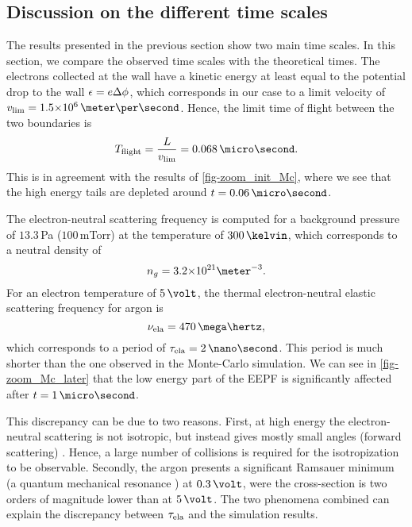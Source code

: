   \subsection{Discussion on the different time scales}
    The results presented in the previous section show two main time scales.
    In this section, we compare the observed time scales with the theoretical times.
    The electrons collected at the wall have a kinetic energy at least equal to the potential drop to the wall $\epsilon = e \Delta \phi$, which corresponds in our case to a limit velocity of $v_{\rm lim} = \sn{1.5}{6} \,\meter\per\second$.
    Hence, the limit time of flight between the two boundaries is
    \[ T_{\rm flight} = \frac{L}{v_{\rm lim}} = 0.068 \,\micro\second.  \]
    This is in agreement with the results of \cref{fig-zoom_init_Mc}, where we see that the high energy tails are depleted around $t=0.06\,\micro\second$.
    
    \vspace{1em}
    The electron-neutral scattering frequency is computed for a background pressure of $13.3$\,Pa (${100}$\,mTorr) at the temperature of $300\,\kelvin$, which corresponds to a neutral density of $${n_g = \sn{3.2}{21} \meter^{-3}}.$$
    For an electron temperature of $5\,\volt$, the thermal electron-neutral elastic scattering frequency for argon is \citep[p.73]{lieberman2005}
    \[ \nu_{\rm ela} = 470 \,\mega\hertz,  \] 
    which corresponds to a period of $\tau_{\rm ela} = 2 \,\nano\second$.
    This period is much shorter than the one observed in the Monte-Carlo simulation.
    We can see in \cref{fig-zoom_Mc_later} that the low energy part of the EEPF is significantly affected after $t=1\,\micro\second$.
    
    This discrepancy can be due to two reasons.
    First, at high energy the electron-neutral scattering is not isotropic, but instead gives mostly small angles (forward scattering) \citep{vahedi1995}.
    Hence, a large number of collisions is required for the isotropization to be observable.
    Secondly, the argon presents a significant Ramsauer minimum (a quantum mechanical resonance \citep{lieberman2005}) at $0.3 \,\volt$, were the cross-section is two orders of magnitude lower than at $5\,\volt$.
    The two phenomena combined can explain the discrepancy between $\tau_{\rm ela}$ and the simulation results.
  
